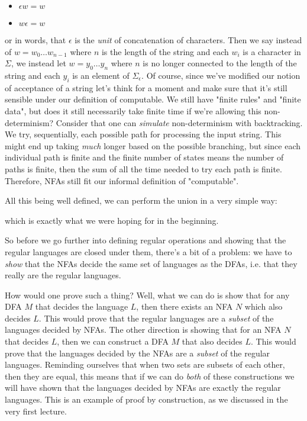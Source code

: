 \documentclass[11pt]{article}
\begin{document}
\begin{itemize}
\item $\epsilon w = w$
\item $w \epsilon = w$
\end{itemize}

or in words, that $\epsilon$ is the \emph{unit} of concatenation of characters. Then we say instead of $w = w_0 \ldots w_{n-1}$ where $n$ is the length of the string and each $w_i$ is a character in $\Sigma$, we instead let $w = y_0 \ldots y_n$ where $n$ is no longer connected to the length of the string and each $y_i$ is an element of $\Sigma_{\epsilon}$. Of course, since we've modified our notion of acceptance of a string let's think for a moment and make sure that it's still sensible under our definition of computable. We still have "finite rules" and "finite data", but does it still necessarily take finite time if we're allowing this non-determinism? Consider that one can \emph{simulate} non-determinism with backtracking. We try, sequentially, each possible path for processing the input string. This might end up taking \emph{much} longer based on the possible branching, but since each individual path is finite and the finite number of states means the number of paths is finite, then the sum of all the time needed to try each path is finite. Therefore, NFAs still fit our informal definition of "computable".

All this being well defined, we can perform the union in a very simple way: 

which is exactly what we were hoping for in the beginning.

So before we go further into defining regular operations and showing that the regular languages are closed under them, there's a bit of a problem: we have to \emph{show} that the NFAs decide the same set of languages as the DFAs, i.e. that they really are the regular languages.

How would one prove such a thing? Well, what we can do is show that for any DFA $M$ that decides the language $L$, then there exists an NFA $N$ which also decides $L$. This would prove that the regular languages are a \emph{subset} of the languages decided by NFAs. The other direction is showing that for an NFA $N$ that decides $L$, then we can construct a DFA $M$ that also decides $L$. This would prove that the languages decided by the NFAs are a \emph{subset} of the regular languages. Reminding ourselves that when two sets are subsets of each other, then they are equal, this means that if we can do \emph{both} of these constructions we will have shown that the languages decided by NFAs are exactly the regular languages. This is an example of proof by construction, as we discussed in the very first lecture.
\end{document}
